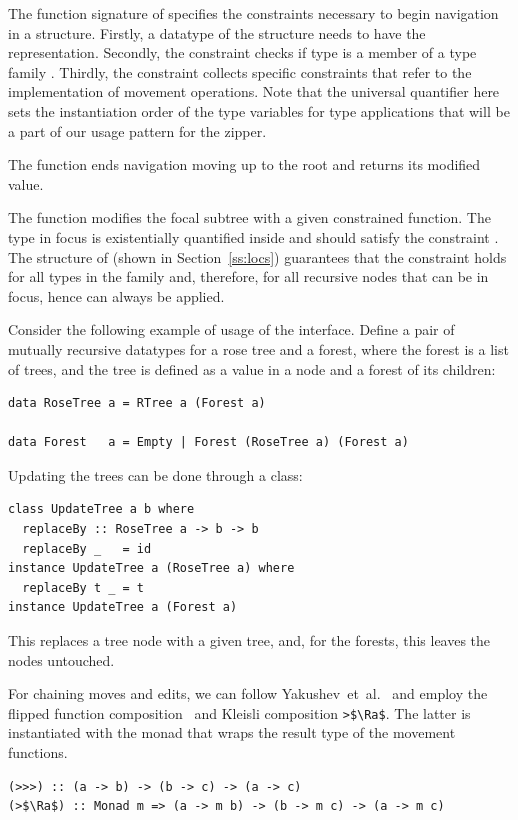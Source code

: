 \documentclass[sigplan,screen,review,anonymous]{acmart}
\begin{document}
The function signature of  specifies the constraints necessary to begin navigation in a structure. Firstly, a datatype of the structure needs to have the  representation. Secondly, the  constraint checks if type  is a member of a type family . Thirdly, the  constraint collects specific constraints that refer to the implementation of movement operations. Note that the universal quantifier here sets the instantiation order of the type variables for type applications that will be a part of our usage pattern for the zipper. 

The  function ends navigation moving up to the root and returns its modified value. 

The  function modifies the focal subtree with a given constrained function. The type in focus is existentially quantified inside  and should satisfy the constraint . The structure of  (shown in Section~\ref{ss:locs}) guarantees that the constraint holds for all types in the family  and, therefore, for all recursive nodes that can be in focus, hence  can always be applied.

Consider the following example of usage of the interface. Define a pair of mutually recursive datatypes for a rose tree and a forest, where the forest is a list of trees, and the tree is defined as a value in a node and a forest of its children:
\begin{lstlisting}[style=fancy]
data RoseTree a = RTree a (Forest a)

data Forest   a = Empty | Forest (RoseTree a) (Forest a)
\end{lstlisting}

Updating the trees can be done through a class:
\begin{lstlisting}[style=fancy]
class UpdateTree a b where
  replaceBy :: RoseTree a -> b -> b
  replaceBy _   = id
instance UpdateTree a (RoseTree a) where
  replaceBy t _ = t
instance UpdateTree a (Forest a)
\end{lstlisting}
This replaces a tree node with a given tree, and, for the forests, this leaves the nodes untouched.

For chaining moves and edits, we can follow Yakushev~et~al.~\cite{MuRec2009} and
employ the flipped function composition \K{>>>}~and Kleisli composition
\lstinline[style=fancy]{>$\Ra$}. The latter is instantiated with the  monad that wraps the
result type of the movement functions.
\begin{lstlisting}[style=fancy]
(>>>) :: (a -> b) -> (b -> c) -> (a -> c)
(>$\Ra$) :: Monad m => (a -> m b) -> (b -> m c) -> (a -> m c)
\end{lstlisting}
\end{document}
